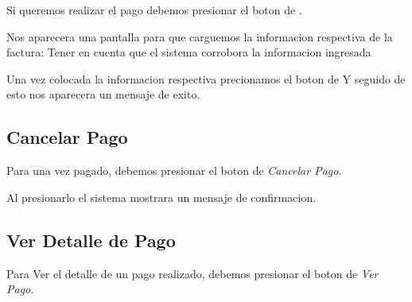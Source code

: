 \documentclass[a4paper,10pt,spanish]{sphinxmanual}
\begin{document}
Si queremos realizar el pago debemos presionar el boton de .


Nos aparecera una pantalla para que carguemos la informacion respectiva de la factura:
Tener en cuenta que el sistema corrobora la informacion ingresada


Una vez colocada la informacion respectiva precionamos el boton de 
Y seguido de esto nos aparecera un mensaje de exito.



\subsection{Cancelar Pago}
\label{compras:cancelar-pago}\label{compras:id2}
Para  una vez pagado, debemos presionar el boton de \emph{Cancelar Pago}.


Al presionarlo el sistema mostrara un mensaje de confirmacion.




\subsection{Ver Detalle de Pago}
\label{compras:ver-detalle-de-pago}\label{compras:ver-detalle-pago}
Para Ver el detalle de un pago realizado, debemos presionar el boton de \emph{Ver Pago}.
\end{document}
